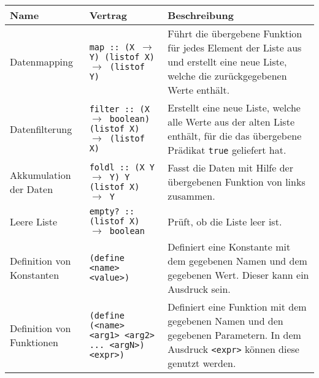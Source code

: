 			\begin{sidewaystable}
				\centering
				\begin{tabular}{p{5cm} | p{7cm} | p{9cm}}
					Name                                                              & Vertrag                                                                                                        & Beschreibung                                                                                                                                                  \\
					\hline
					Datenmapping                                                      & \texttt{map :: (X $ \rightarrow $ Y) (listof X) $ \rightarrow $ (listof Y)}                                    & Führt die übergebene Funktion für jedes Element der Liste aus und erstellt eine neue Liste, welche die zurückgegebenen Werte enthält.                         \\
					Datenfilterung                                                    & \texttt{filter :: (X $ \rightarrow $ boolean) (listof X) $ \rightarrow $ (listof X)}                           & Erstellt eine neue Liste, welche alle Werte aus der alten Liste enthält, für die das übergebene Prädikat \texttt{true} geliefert hat.                         \\
					Akkumulation der Daten                                            & \texttt{foldl :: (X Y $ \rightarrow $ Y) Y (listof X) $ \rightarrow $ Y}                                       & Fasst die Daten mit Hilfe der übergebenen Funktion von links zusammen.                                                                                        \\
					Leere Liste                                                       & \texttt{empty? :: (listof X) $ \rightarrow $ boolean}                                                          & Prüft, ob die Liste leer ist.                                                                                                                                 \\
					\hline
					Definition von Konstanten                                         & \texttt{(define <name> <value>)}                                                                               & Definiert eine Konstante mit dem gegebenen Namen und dem gegebenen Wert. Dieser kann ein Ausdruck sein.                                                       \\
					Definition von Funktionen                                         & \texttt{(define (<name> <arg1> <arg2> ... <argN>) <expr>)}                                                     & Definiert eine Funktion mit dem gegebenen Namen und den gegebenen Parametern. In dem Ausdruck \texttt{<expr>} können diese genutzt werden.                    \\

\end{tabular}
\end{sidewaystable}

